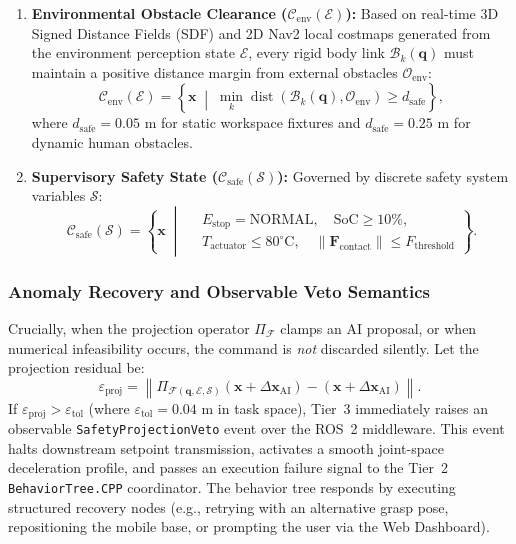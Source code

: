 \begin{enumerate}[leftmargin=1.5em]
  \item \textbf{Environmental Obstacle Clearance ($\mathcal{C}_{\text{env}}(\mathcal{E})$):}
  Based on real-time 3D Signed Distance Fields (SDF) and 2D Nav2 local costmaps generated from the environment perception state $\mathcal{E}$, every rigid body link $\mathcal{B}_k(\mathbf{q})$ must maintain a positive distance margin from external obstacles $\mathcal{O}_{\text{env}}$:
  \begin{equation}
    \mathcal{C}_{\text{env}}(\mathcal{E}) = \left\{ \mathbf{x} \;\middle|\; \min_{k} \operatorname{dist}\left(\mathcal{B}_k(\mathbf{q}), \mathcal{O}_{\text{env}}\right) \ge d_{\text{safe}} \right\},
  \end{equation}
  where $d_{\text{safe}} = 0.05\text{ m}$ for static workspace fixtures and $d_{\text{safe}} = 0.25\text{ m}$ for dynamic human obstacles.

  \item \textbf{Supervisory Safety State ($\mathcal{C}_{\text{safe}}(\mathcal{S})$):}
  Governed by discrete safety system variables $\mathcal{S}$:
  \begin{equation}
    \mathcal{C}_{\text{safe}}(\mathcal{S}) = \left\{ \mathbf{x} \;\middle|\;
    \begin{aligned}
      &E_{\text{stop}} = \text{NORMAL}, \quad \text{SoC} \ge 10\%, \\
      &T_{\text{actuator}} \le 80^\circ\text{C}, \quad \|\mathbf{F}_{\text{contact}}\| \le F_{\text{threshold}}
    \end{aligned}
    \right\}.
  \end{equation}
\end{enumerate}

\subsubsection{Anomaly Recovery and Observable Veto Semantics}
Crucially, when the projection operator $\Pi_{\mathcal{F}}$ clamps an AI proposal, or when numerical infeasibility occurs, the command is \emph{not} discarded silently. Let the projection residual be:
\begin{equation}
  \varepsilon_{\text{proj}} = \left\| \Pi_{\mathcal{F}(\mathbf{q}, \mathcal{E}, \mathcal{S})}\left(\mathbf{x} + \Delta\mathbf{x}_{\text{AI}}\right) - \left(\mathbf{x} + \Delta\mathbf{x}_{\text{AI}}\right) \right\|.
\end{equation}
If $\varepsilon_{\text{proj}} > \varepsilon_{\text{tol}}$ (where $\varepsilon_{\text{tol}} = 0.04\text{ m}$ in task space), Tier~3 immediately raises an observable \texttt{\small SafetyProjectionVeto} event over the ROS~2 middleware. This event halts downstream setpoint transmission, activates a smooth joint-space deceleration profile, and passes an execution failure signal to the Tier~2 \texttt{BehaviorTree.CPP} coordinator. The behavior tree responds by executing structured recovery nodes (e.g., retrying with an alternative grasp pose, repositioning the mobile base, or prompting the user via the Web Dashboard).

